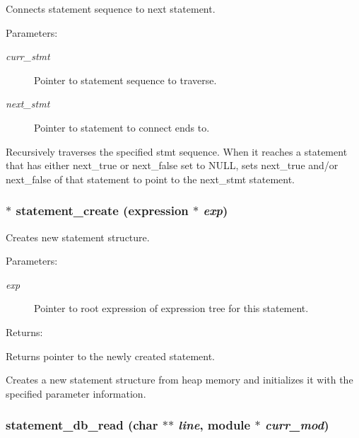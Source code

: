 Connects statement sequence to next statement.

\begin{Desc}
\item[Parameters: ]\par
\begin{description}
\item[{\em 
curr\_\-stmt}]Pointer to statement sequence to traverse. \item[{\em 
next\_\-stmt}]Pointer to statement to connect ends to.\end{description}
\end{Desc}
Recursively traverses the specified stmt sequence. When it reaches a statement  that has either next\_\-true or next\_\-false set to NULL, sets next\_\-true and/or  next\_\-false of that statement to point to the next\_\-stmt statement. 
\subsubsection{$\ast$ statement\_\-create ({\bf expression} $\ast$ {\em exp})}\label{statement_8c_a0}


Creates new statement structure.

\begin{Desc}
\item[Parameters: ]\par
\begin{description}
\item[{\em 
exp}]Pointer to root expression of expression tree for this statement.\end{description}
\end{Desc}
\begin{Desc}
\item[Returns: ]\par
Returns pointer to the newly created statement.\end{Desc}
Creates a new statement structure from heap memory and initializes it with the specified parameter information. 
\subsubsection{ statement\_\-db\_\-read (char $\ast$$\ast$ {\em line}, {\bf module} $\ast$ {\em curr\_\-mod})}\label{statement_8c_a2}


